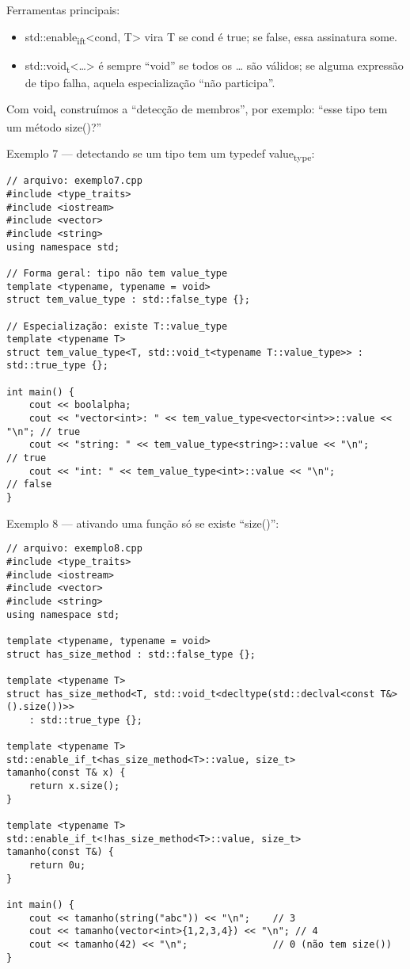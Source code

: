 \documentclass[11pt]{article}
\begin{document}
Ferramentas principais:
\begin{itemize}
\item std::enable\textsubscript{if}\textsubscript{t}<cond, T> vira T se cond é true; se false, essa assinatura some.
\item std::void\textsubscript{t}<\ldots{}> é sempre “void” se todos os \ldots{} são válidos; se alguma expressão de tipo falha, aquela especialização “não participa”.
\end{itemize}

Com void\textsubscript{t} construímos a “detecção de membros”, por exemplo: “esse tipo tem um método size()?”

Exemplo 7 — detectando se um tipo tem um typedef value\textsubscript{type}:
\begin{verbatim}
// arquivo: exemplo7.cpp
#include <type_traits>
#include <iostream>
#include <vector>
#include <string>
using namespace std;

// Forma geral: tipo não tem value_type
template <typename, typename = void>
struct tem_value_type : std::false_type {};

// Especialização: existe T::value_type
template <typename T>
struct tem_value_type<T, std::void_t<typename T::value_type>> : std::true_type {};

int main() {
    cout << boolalpha;
    cout << "vector<int>: " << tem_value_type<vector<int>>::value << "\n"; // true
    cout << "string: " << tem_value_type<string>::value << "\n";           // true
    cout << "int: " << tem_value_type<int>::value << "\n";                 // false
}
\end{verbatim}

Exemplo 8 — ativando uma função só se existe “size()”:
\begin{verbatim}
// arquivo: exemplo8.cpp
#include <type_traits>
#include <iostream>
#include <vector>
#include <string>
using namespace std;

template <typename, typename = void>
struct has_size_method : std::false_type {};

template <typename T>
struct has_size_method<T, std::void_t<decltype(std::declval<const T&>().size())>>
    : std::true_type {};

template <typename T>
std::enable_if_t<has_size_method<T>::value, size_t>
tamanho(const T& x) {
    return x.size();
}

template <typename T>
std::enable_if_t<!has_size_method<T>::value, size_t>
tamanho(const T&) {
    return 0u;
}

int main() {
    cout << tamanho(string("abc")) << "\n";    // 3
    cout << tamanho(vector<int>{1,2,3,4}) << "\n"; // 4
    cout << tamanho(42) << "\n";               // 0 (não tem size())
}
\end{verbatim}
\end{document}
